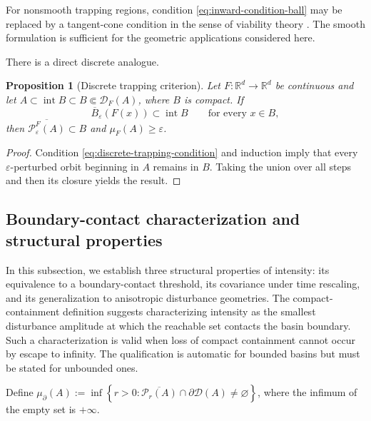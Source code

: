 \documentclass[pdflatex,sn-mathphys-num]{sn-jnl}
\numberwithin{equation}{section}
\theoremstyle{thmstyleone}%
\newtheorem{proposition}[theorem]{Proposition}
\theoremstyle{definition}
\theoremstyle{remark}
\begin{document}
For nonsmooth trapping regions, condition \eqref{eq:inward-condition-ball} may be replaced by a tangent-cone condition in the sense of viability theory \citep{aubin1982differential}. The smooth formulation is sufficient for the geometric applications considered here.

There is a direct discrete analogue.

\begin{proposition}[Discrete trapping criterion]
\label{prop:discrete-trapping}
Let $F:\mathbb R^d\to\mathbb R^d$ be continuous and let
    $A\subset\operatorname{int}B
    \subset B\Subset\mathcal D_F(A)$,
where $B$ is compact. If
\begin{equation}
\label{eq:discrete-trapping-condition}
    \overline B_\varepsilon(F(x))
    \subset\operatorname{int}B
    \qquad
    \text{for every }x\in B,
\end{equation}
then
$\overline{\mathcal P_\varepsilon^F(A)}
    \subset B$
and
$\mu_F(A)\geq\varepsilon$.
\end{proposition}

\begin{proof}
Condition \eqref{eq:discrete-trapping-condition} and induction imply that every $\varepsilon$-perturbed orbit beginning in $A$ remains in $B$. Taking the union over all steps and then its closure yields the result.
\end{proof}

\subsection{Boundary-contact characterization and structural properties}
\label{subsec:first-contact}

In this subsection, we establish three structural properties of intensity: its equivalence to a boundary-contact threshold, its covariance under time rescaling, and its generalization to anisotropic disturbance geometries.
The compact-containment definition suggests characterizing intensity as the smallest disturbance amplitude at which the reachable set contacts the basin boundary. Such a characterization is valid when loss of compact containment cannot occur by escape to infinity. The qualification is automatic for bounded basins but must be stated for unbounded ones.

Define
    $\mu_{\partial}(A)
    :=
    \inf\left\{
    r>0:
    \overline{\mathcal P_r(A)}
    \cap\partial\mathcal D(A)
    \neq\varnothing
    \right\}$,
where the infimum of the empty set is $+\infty$.
\end{document}
